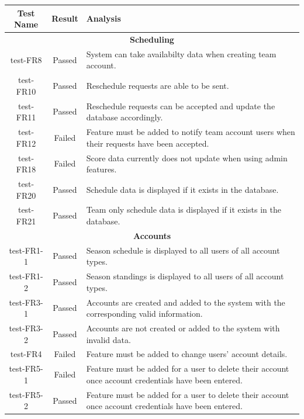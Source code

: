 \documentclass[12pt, titlepage]{article}
\begin{document}
\begin{longtable}{|c|c|p{8cm}|}
  \hline
  \textbf{Test Name} & \textbf{Result} & \textbf{Analysis}\\
  \hline
  \multicolumn{3}{|c|}{\textbf{Scheduling}}\\
  \hline
  test-FR8 & Passed & System can take availabilty data when creating team
  account.\\
  \hline
  test-FR10 & Passed & Reschedule requests are able to be sent.\\
  \hline
  test-FR11 & Passed & Reschedule requests can be accepted and update the
  database accordingly.\\
  \hline
  test-FR12 & Failed & Feature must be added to notify team account users
  when their requests have been accepted.\\
  \hline
  test-FR18 & Failed & Score data currently does not update when using admin
  features.\\
  \hline
  test-FR20 & Passed & Schedule data is displayed if it exists in the
  database.\\
  \hline
  test-FR21 & Passed & Team only schedule data is displayed if it exists in
  the database.\\
  \hline
  \multicolumn{3}{|c|}{\textbf{Accounts}} \\
  \hline
  test-FR1-1 & Passed & Season schedule is displayed to all users of all account types.\\
  \hline
  test-FR1-2 & Passed & Season standings is displayed to all users of all account types.\\
  \hline
  test-FR3-1 & Passed & Accounts are created and added to the system with the corresponding valid information.\\
  \hline
  test-FR3-2 & Passed & Accounts are not created or added to the system with invalid data.\\
  \hline
  test-FR4 & Failed & Feature must be added to change users' account details.\\
  \hline
  test-FR5-1 & Failed & Feature must be added for a user to delete their account once account credentials have been entered.\\
  \hline
  test-FR5-2 & Passed & Feature must be added for a user to delete their account once account credentials have been entered.\\

\end{longtable}
\end{document}
